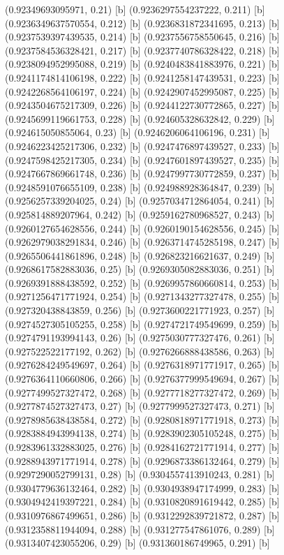 {{{(0.92349693095971, 0.21) [b] 
(0.9236297554237222, 0.211) [b] 
(0.9236349637570554, 0.212) [b] 
(0.9236831872341695, 0.213) [b] 
(0.9237539397439535, 0.214) [b] 
(0.9237556758550645, 0.216) [b] 
(0.9237584536328421, 0.217) [b] 
(0.9237740786328422, 0.218) [b] 
(0.9238094952995088, 0.219) [b] 
(0.9240483841883976, 0.221) [b] 
(0.9241174814106198, 0.222) [b] 
(0.9241258147439531, 0.223) [b] 
(0.9242268564106197, 0.224) [b] 
(0.9242907452995087, 0.225) [b] 
(0.9243504675217309, 0.226) [b] 
(0.9244122730772865, 0.227) [b] 
(0.9245699119661753, 0.228) [b] 
(0.924605328632842, 0.229) [b] 
(0.924615050855064, 0.23) [b] 
(0.9246206064106196, 0.231) [b] 
(0.9246223425217306, 0.232) [b] 
(0.9247476897439527, 0.233) [b] 
(0.9247598425217305, 0.234) [b] 
(0.9247601897439527, 0.235) [b] 
(0.9247667869661748, 0.236) [b] 
(0.9247997730772859, 0.237) [b] 
(0.9248591076655109, 0.238) [b] 
(0.924988928364847, 0.239) [b] 
(0.9256257339204025, 0.24) [b] 
(0.9257034712864054, 0.241) [b] 
(0.925814889207964, 0.242) [b] 
(0.9259162780968527, 0.243) [b] 
(0.9260127654628556, 0.244) [b] 
(0.9260190154628556, 0.245) [b] 
(0.9262979038291834, 0.246) [b] 
(0.9263714745285198, 0.247) [b] 
(0.9265506441861896, 0.248) [b] 
(0.926823216621637, 0.249) [b] 
(0.9268617582883036, 0.25) [b] 
(0.9269305082883036, 0.251) [b] 
(0.9269391888438592, 0.252) [b] 
(0.9269957860660814, 0.253) [b] 
(0.9271256471771924, 0.254) [b] 
(0.9271343277327478, 0.255) [b] 
(0.927320438843859, 0.256) [b] 
(0.9273600221771923, 0.257) [b] 
(0.9274527305105255, 0.258) [b] 
(0.9274721749549699, 0.259) [b] 
(0.9274791193994143, 0.26) [b] 
(0.9275030777327476, 0.261) [b] 
(0.927522522177192, 0.262) [b] 
(0.9276266888438586, 0.263) [b] 
(0.9276284249549697, 0.264) [b] 
(0.9276318971771917, 0.265) [b] 
(0.9276364110660806, 0.266) [b] 
(0.9276377999549694, 0.267) [b] 
(0.9277499527327472, 0.268) [b] 
(0.9277718277327472, 0.269) [b] 
(0.9277874527327473, 0.27) [b] 
(0.9277999527327473, 0.271) [b] 
(0.9278985638438584, 0.272) [b] 
(0.9280818971771918, 0.273) [b] 
(0.9283884943994138, 0.274) [b] 
(0.9283902305105248, 0.275) [b] 
(0.9283961332883025, 0.276) [b] 
(0.9284162721771914, 0.277) [b] 
(0.9288943971771914, 0.278) [b] 
(0.9296873386132464, 0.279) [b] 
(0.9297290052799131, 0.28) [b] 
(0.9304557413910243, 0.281) [b] 
(0.9304779636132464, 0.282) [b] 
(0.9304938947174999, 0.283) [b] 
(0.9304942419397221, 0.284) [b] 
(0.9310820891619442, 0.285) [b] 
(0.9310976867499651, 0.286) [b] 
(0.9312292839721872, 0.287) [b] 
(0.9312358811944094, 0.288) [b] 
(0.931277547861076, 0.289) [b] 
(0.9313407423055206, 0.29) [b] 
(0.931360186749965, 0.291) [b] 
}}}
